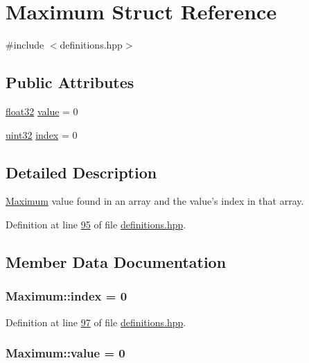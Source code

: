 \hypertarget{structMaximum}{\section{Maximum Struct Reference}
\label{structMaximum}
}


{\ttfamily \#include $<$definitions.\+hpp$>$}

\subsection*{Public Attributes}
\begin{DoxyCompactItemize}
\item 
\hyperlink{definitions_8hpp_aacdc525d6f7bddb3ae95d5c311bd06a1}{float32} \hyperlink{structMaximum_aa7e84cbf37b694670142670014366969}{value} = 0
\item 
\hyperlink{definitions_8hpp_a1134b580f8da4de94ca6b1de4d37975e}{uint32} \hyperlink{structMaximum_a2e6aef03795cd285fe542d0861c6e3b5}{index} = 0
\end{DoxyCompactItemize}


\subsection{Detailed Description}
\hyperlink{structMaximum}{Maximum} value found in an array and the value's index in that array. 

Definition at line \hyperlink{definitions_8hpp_source_l00095}{95} of file \hyperlink{definitions_8hpp_source}{definitions.\+hpp}.



\subsection{Member Data Documentation}
\hypertarget{structMaximum_a2e6aef03795cd285fe542d0861c6e3b5}{
\subsubsection[{index}]{ Maximum\+::index = 0}}\label{structMaximum_a2e6aef03795cd285fe542d0861c6e3b5}


Definition at line \hyperlink{definitions_8hpp_source_l00097}{97} of file \hyperlink{definitions_8hpp_source}{definitions.\+hpp}.

\hypertarget{structMaximum_aa7e84cbf37b694670142670014366969}{
\subsubsection[{value}]{ Maximum\+::value = 0}}\label{structMaximum_aa7e84cbf37b694670142670014366969}


